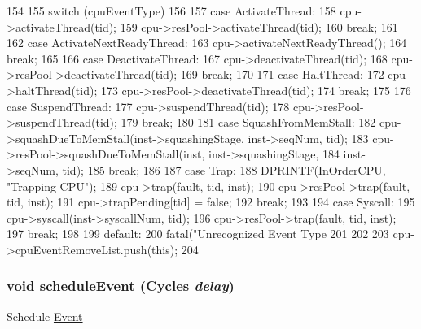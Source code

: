 \begin{DoxyCode}
154 {
155     switch (cpuEventType)
156     {
157       case ActivateThread:
158         cpu->activateThread(tid);
159         cpu->resPool->activateThread(tid);
160         break;
161 
162       case ActivateNextReadyThread:
163         cpu->activateNextReadyThread();
164         break;
165 
166       case DeactivateThread:
167         cpu->deactivateThread(tid);
168         cpu->resPool->deactivateThread(tid);
169         break;
170 
171       case HaltThread:
172         cpu->haltThread(tid);
173         cpu->resPool->deactivateThread(tid);
174         break;
175 
176       case SuspendThread: 
177         cpu->suspendThread(tid);
178         cpu->resPool->suspendThread(tid);
179         break;
180 
181       case SquashFromMemStall:
182         cpu->squashDueToMemStall(inst->squashingStage, inst->seqNum, tid);
183         cpu->resPool->squashDueToMemStall(inst, inst->squashingStage,
184                                           inst->seqNum, tid);
185         break;
186 
187       case Trap:
188         DPRINTF(InOrderCPU, "Trapping CPU\n");
189         cpu->trap(fault, tid, inst);
190         cpu->resPool->trap(fault, tid, inst);
191         cpu->trapPending[tid] = false;
192         break;
193 
194       case Syscall:
195         cpu->syscall(inst->syscallNum, tid);
196         cpu->resPool->trap(fault, tid, inst);
197         break;
198 
199       default:
200         fatal("Unrecognized Event Type %
201     }
202     
203     cpu->cpuEventRemoveList.push(this);
204 }
\end{DoxyCode}
\hypertarget{classInOrderCPU_1_1CPUEvent_af53dcbdc9da1cc615d43ff3bd2b4162c}{
\subsubsection[{scheduleEvent}]{\setlength{\rightskip}{0pt plus 5cm}void scheduleEvent ({\bf Cycles} {\em delay})}}
\label{classInOrderCPU_1_1CPUEvent_af53dcbdc9da1cc615d43ff3bd2b4162c}
Schedule \hyperlink{classEvent}{Event} 



